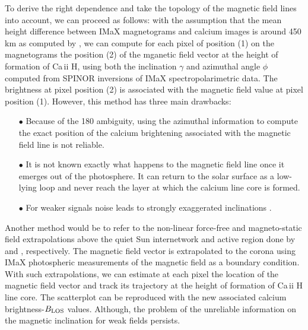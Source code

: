 \documentclass[goettingen, gauss, print]{thesis}
\begin{document}
To derive the right dependence and take the topology of the magnetic field lines into account, we can proceed as follows: with the assumption that the mean height difference between IMaX magnetograms and calcium images is around 450 km as computed by \cite{jafarzadeh_structure_2013}, we can compute for each pixel of position (1) on the magnetograms the position (2) of the mganetic field vector at the height of formation of Ca\,{\sc ii} H, using both the inclination $\gamma$ and azimuthal angle $\phi$ computed from SPINOR inversions of IMaX spectropolarimetric data. The brightness at pixel position (2) is associated with the magnetic field value at pixel position (1). However, this method has three main drawbacks:
\begin{itemize}
\item[$\bullet$] Because of the 180 ambiguity, using the azimuthal information to compute the exact position of the calcium brightening associated with the magnetic field line is not reliable.

\item[$\bullet$] It is not known exactly what happens to the magnetic field line once it emerges out of the photosphere. It can return to the solar surface as a low-lying loop and never reach the layer at which the calcium line core is formed.

\item[$\bullet$] For weaker signals noise leads to strongly exaggerated inclinations \citep{borrero_inferring_2011, jafarzadeh_inclinations_2014}. 
\end{itemize}
Another method would be to refer to the non-linear force-free and magneto-static field extrapolations above the quiet Sun internetwork and active region done by \cite{wiegelmann_evolution_2013} and \cite{wiegelmann_magneto-static_2017}, respectively. The magnetic field vector is extrapolated to the corona using IMaX photospheric measurements of the magnetic field as a boundary condition. With such extrapolations, we can estimate at each pixel the location of the magnetic field vector and track its trajectory at the height of formation of Ca\,{\sc ii} H line core. The scatterplot can be reproduced with the new associated calcium brightness-$B_{\rm LOS}$ values. Although, the problem of the unreliable information on the magnetic inclination for weak fields persists. 
\end{document}
